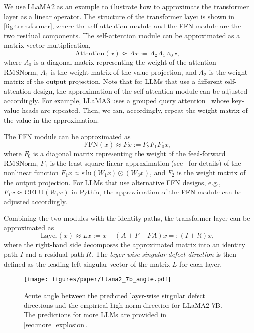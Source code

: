 We use LLaMA2 as an example to illustrate how to approximate the transformer layer as a linear operator.
The structure of the transformer layer is shown in \cref{fig:transformer}, where the self-attention module and the FFN module are the two residual components.
The self-attention module can be approximated as a matrix-vector multiplication,
\begin{equation}\label{eq:attention}
    \textrm{Attention}(x) \approx Ax:= A_2 A_1 A_0 x,
\end{equation}
where \(A_0\) is a diagonal matrix representing the weight of the attention RMSNorm, \(A_1\) is the weight matrix of the value projection, and \(A_2\) is the weight matrix of the output projection.
Note that for LLMs that use a different self-attention design, the approximation of the self-attention module can be adjusted accordingly.
For example, LLaMA3 uses a grouped query attention~\cite{ainslie2023gqa} whose key-value heads are repeated.
Then, we can, accordingly, repeat the weight matrix of the value in the approximation.

The FFN module can be approximated as
\begin{equation}\label{eq:ffn}
    \textrm{FFN}(x) \approx Fx := F_2 F_1 F_0 x,
\end{equation}
where \(F_0\) is a diagonal matrix representing the weight of the feed-forward RMSNorm, \(F_1\) is the least-square linear approximation (see~\cite{wang2024sinder} for details) of the nonlinear function \(F_1 x \approx \textrm{silu}(W_1 x) \odot (W_3 x)\), and \(F_2\) is the weight matrix of the output projection.
For LLMs that use alternative FFN designs, e.g., \(F_1 x \approx \textrm{GELU}(W_1 x)\) in Pythia, the approximation of the FFN module can be adjusted accordingly.

Combining the two modules with the identity paths, the transformer layer can be approximated as
\begin{equation}\label{eq:layer}
    \textrm{Layer}(x) \approx L x := x + (A+F+FA)x =: (I + R)x,
\end{equation}
where the right-hand side decomposes the approximated matrix into an identity path \(I\) and a residual path \(R\).
The \emph{layer-wise singular defect direction} is then defined as the leading left singular vector of the matrix \(L\) for each layer.

\begin{figure}[t]
    \centering
    \texttt{[image: figures/paper/llama2\_7b\_angle.pdf]}
    \vspace{-0.5em}
    \caption{Acute angle between the predicted layer-wise singular defect directions and the empirical high-norm direction for LLaMA2-7B.
    The predictions for more LLMs are provided in \cref{sec:more_explosion}.
    }\label{fig:llama2_angle}
    \vspace{-0.5em}
\end{figure}

